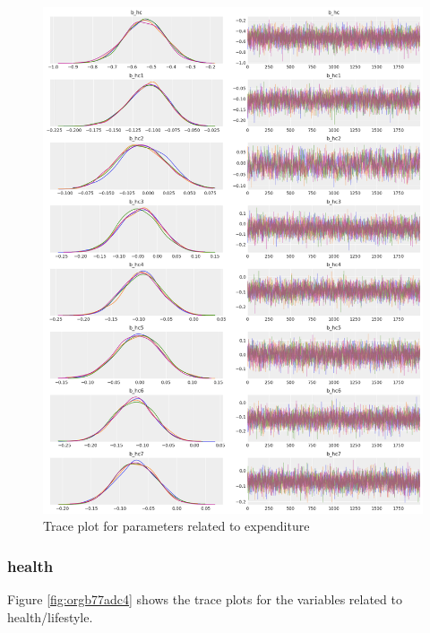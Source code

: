 \documentclass{article}
\begin{document}
\begin{figure}[htbp]
\centering
\includegraphics[width=.9\linewidth]{./figures/trace_expenditure.png}
\caption{\label{fig:org79091bd}Trace plot for parameters related to expenditure}
\end{figure}


\subsubsection{health}
\label{sec:org21bab84}

Figure \ref{fig:orgb77adc4} shows the trace plots for the variables related to health/lifestyle.
\end{document}
